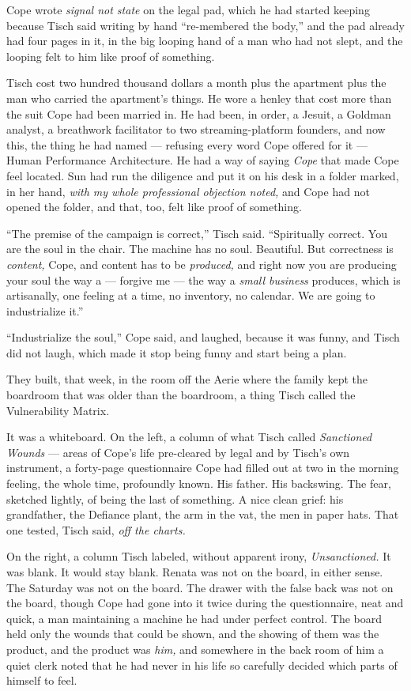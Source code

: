 \documentclass[11pt,openany]{book}
\newcommand{\scenebreak}{\par\vspace{0.5\baselineskip}\begin{center}\textasteriskcentered\quad\textasteriskcentered\quad\textasteriskcentered\end{center}\vspace{0.5\baselineskip}\par}
\begin{document}
Cope wrote \textit{signal not state} on the legal pad, which he had started keeping because Tisch said writing by hand ``re-membered the body,'' and the pad already had four pages in it, in the big looping hand of a man who had not slept, and the looping felt to him like proof of something.

Tisch cost two hundred thousand dollars a month plus the apartment plus the man who carried the apartment's things. He wore a henley that cost more than the suit Cope had been married in. He had been, in order, a Jesuit, a Goldman analyst, a breathwork facilitator to two streaming-platform founders, and now this, the thing he had named --- refusing every word Cope offered for it --- Human Performance Architecture. He had a way of saying \textit{Cope} that made Cope feel located. Sun had run the diligence and put it on his desk in a folder marked, in her hand, \textit{with my whole professional objection noted,} and Cope had not opened the folder, and that, too, felt like proof of something.

``The premise of the campaign is correct,'' Tisch said. ``Spiritually correct. You are the soul in the chair. The machine has no soul. Beautiful. But correctness is \textit{content,} Cope, and content has to be \textit{produced,} and right now you are producing your soul the way a --- forgive me --- the way a \textit{small business} produces, which is artisanally, one feeling at a time, no inventory, no calendar. We are going to industrialize it.''

``Industrialize the soul,'' Cope said, and laughed, because it was funny, and Tisch did not laugh, which made it stop being funny and start being a plan.


\scenebreak


They built, that week, in the room off the Aerie where the family kept the boardroom that was older than the boardroom, a thing Tisch called the Vulnerability Matrix.

It was a whiteboard. On the left, a column of what Tisch called \textit{Sanctioned Wounds} --- areas of Cope's life pre-cleared by legal and by Tisch's own instrument, a forty-page questionnaire Cope had filled out at two in the morning feeling, the whole time, profoundly known. His father. His backswing. The fear, sketched lightly, of being the last of something. A nice clean grief: his grandfather, the Defiance plant, the arm in the vat, the men in paper hats. That one tested, Tisch said, \textit{off the charts.}

On the right, a column Tisch labeled, without apparent irony, \textit{Unsanctioned.} It was blank. It would stay blank. Renata was not on the board, in either sense. The Saturday was not on the board. The drawer with the false back was not on the board, though Cope had gone into it twice during the questionnaire, neat and quick, a man maintaining a machine he had under perfect control. The board held only the wounds that could be shown, and the showing of them was the product, and the product was \textit{him,} and somewhere in the back room of him a quiet clerk noted that he had never in his life so carefully decided which parts of himself to feel.
\end{document}
